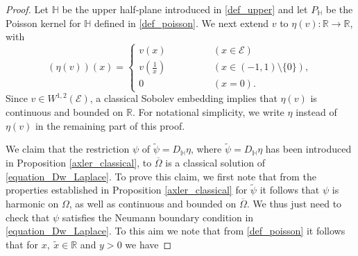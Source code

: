 \documentclass{amsart} %
\numberwithin{equation}{section}
\theoremstyle{definition}
\begin{document}
\begin{proof}
Let $\mathbb{H}$ be the upper half-plane introduced in \eqref{def_upper}
and  let $P_\mathbb{H}$ be the Poisson kernel for $\mathbb{H}$ defined in \eqref{def_poisson}.
We next extend $v$ to $\eta(v):\mathbb{R}\to \mathbb{R}$, with 
\begin{equation}\label{numar_eta_prim}
(\eta(v))(x)=\begin{cases}
    v(x) & \qquad\qquad(x\in \mathcal{E})\\
    v\left(\frac1x\right) & \qquad\qquad(x\in (-1,1)\setminus \{0\}),\\
    0 & \qquad\qquad(x=0).
\end{cases}
\end{equation}
Since $v\in W^{1,2}(\mathcal{E})$, a classical Sobolev embedding implies that $\eta(v)$ is continuous and bounded on $\mathbb{R}$. For notational simplicity, we write $\eta$ instead of $\eta(v)$ in the remaining part of this proof.

We claim that the restriction $\psi$ of $\tilde\psi=D_\mathbb{H}\eta$, where $\tilde\psi=D_\mathbb{H}\eta$ has been introduced in Proposition \ref{axler_classical}, to $\overline\Omega$ is a classical solution of \eqref{equation_Dw_Laplace}. To prove this claim, we first note that from
the properties established in Proposition \ref{axler_classical} for $\tilde\psi$ it
follows that $\psi$ is harmonic on $\Omega$, as well as  continuous and bounded on $\overline \Omega$.
We thus just need to check that $\psi$ satisfies the Neumann boundary condition in \eqref{equation_Dw_Laplace}.
To this aim we note that from \eqref{def_poisson} it follows that
for $x,\ \tilde x\in \mathbb{R}$ and $y>0$ we have


\end{proof}
\end{document}
